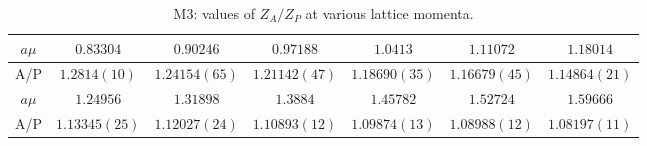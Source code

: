 \begin{table}[h!]
\begin{center}
\caption{M3: values of $Z_A/Z_P$ at various lattice momenta.}
\begin{tabular}{c|c c c c c c}
\hline
\hline
$a\mu$ & $0.83304$ & $0.90246$ & $0.97188$ & $1.0413$ & $1.11072$ & $1.18014$ \\
\hline
A/P & $1.2814(10)$ & $1.24154(65)$ & $1.21142(47)$ & $1.18690(35)$ & $1.16679(45)$ & $1.14864(21)$ \\
\hline
$a\mu$ & $1.24956$ & $1.31898$ & $1.3884$ & $1.45782$ & $1.52724$ & $1.59666$ \\
\hline
A/P & $1.13345(25)$ & $1.12027(24)$ & $1.10893(12)$ & $1.09874(13)$ & $1.08988(12)$ & $1.08197(11)$ \\
\hline
\hline
\end{tabular}
\end{center}
\end{table}